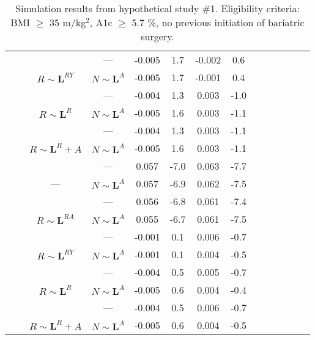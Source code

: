 \begin{table}[H]
\begin{tabular}{|>{}Sc|Sc|Sc|Sc|Sc|Sc|c|>{}c|}
 &  &  & --- & -0.005 & 1.7 & -0.002 & 0.6\\
 &  &  & $N \sim \bm{L}^{A}$ & -0.005 & 1.7 & -0.001 & 0.4\\
 &  &  & --- & -0.004 & 1.3 & 0.003 & -1.0\\
 &  &  & $N \sim \bm{L}^{A}$ & -0.005 & 1.6 & 0.003 & -1.1\\
 &  &  & --- & -0.004 & 1.3 & 0.003 & -1.1\\
 &  &  & $N \sim \bm{L}^{A}$ & -0.005 & 1.6 & 0.003 & -1.1\\
 &  &  & --- & 0.057 & -7.0 & 0.063 & -7.7\\
 &  &  & $N \sim \bm{L}^{A}$ & 0.057 & -6.9 & 0.062 & -7.5\\
 &  &  & --- & 0.056 & -6.8 & 0.061 & -7.4\\
 &  &  & $N \sim \bm{L}^{A}$ & 0.055 & -6.7 & 0.061 & -7.5\\
 &  &  & --- & -0.001 & 0.1 & 0.006 & -0.7\\
 &  &  & $N \sim \bm{L}^{A}$ & -0.001 & 0.1 & 0.004 & -0.5\\
 &  &  & --- & -0.004 & 0.5 & 0.005 & -0.7\\
 &  &  & $N \sim \bm{L}^{A}$ & -0.005 & 0.6 & 0.004 & -0.4\\
 &  &  & --- & -0.004 & 0.5 & 0.006 & -0.7\\
 &  &  & $N \sim \bm{L}^{A}$ & -0.005 & 0.6 & 0.004 & -0.5\\
\hline
\end{tabular}\caption{Simulation results from hypothetical study \#1. Eligibility criteria: BMI $\geq$ 35 m/kg$^2$, A1c $\geq$ 5.7 \%, no previous initiation of bariatric surgery.}\label{table:results_1}
\end{table}
